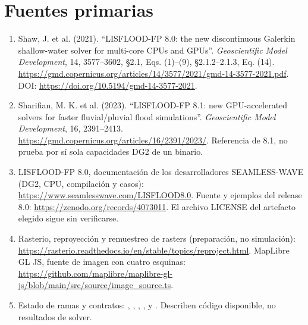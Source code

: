 \documentclass[11pt,a4paper]{article}
\begin{document}
\section{Fuentes primarias}
\begin{enumerate}
\item Shaw, J. et al. (2021). ``LISFLOOD-FP 8.0: the new discontinuous Galerkin shallow-water solver for multi-core CPUs and GPUs''. \emph{Geoscientific Model Development}, 14, 3577--3602, §2.1, Eqs. (1)--(9), §2.1.2--2.1.3, Eq. (14). \url{https://gmd.copernicus.org/articles/14/3577/2021/gmd-14-3577-2021.pdf}. DOI: \url{https://doi.org/10.5194/gmd-14-3577-2021}.
\item Sharifian, M. K. et al. (2023). ``LISFLOOD-FP 8.1: new GPU-accelerated solvers for faster fluvial/pluvial flood simulations''. \emph{Geoscientific Model Development}, 16, 2391--2413. \url{https://gmd.copernicus.org/articles/16/2391/2023/}. Referencia de 8.1, no prueba por sí sola capacidades DG2 de un binario.
\item LISFLOOD-FP 8.0, documentación de los desarrolladores SEAMLESS-WAVE (DG2, CPU, compilación y casos): \url{https://www.seamlesswave.com/LISFLOOD8.0}. Fuente y ejemplos del release 8.0: \url{https://zenodo.org/records/4073011}. El archivo LICENSE del artefacto elegido sigue sin verificarse.
\item Rasterio, reproyección y remuestreo de rasters (preparación, no simulación): \url{https://rasterio.readthedocs.io/en/stable/topics/reproject.html}. MapLibre GL JS, fuente de imagen con cuatro esquinas: \url{https://github.com/maplibre/maplibre-gl-js/blob/main/src/source/image_source.ts}.
\item Estado de ramas y contratos: , , , ,  y . Describen código disponible, no resultados de solver.
\end{enumerate}
\end{document}
